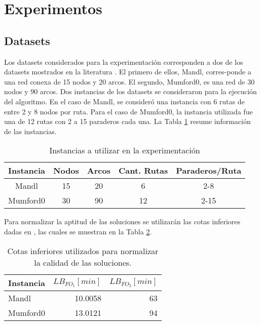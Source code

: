 \section{Experimentos}

\subsection{Datasets}

Los datasets considerados para la experimentación corresponden a dos de los datasets mostrados en la literatura \cite{john2014improved,NewHaEOps}. El primero de ellos, Mandl, corres-ponde a una red conexa de 15 nodos y 20 arcos. El segundo, Mumford0, es una red de 30 nodos y 90 arcos.  Dos instancias de los datasets se consideraron para la ejecución del algoritmo. En el caso de Mandl, se consideró una instancia con 6 rutas de entre 2 y 8 nodos por ruta. Para el caso de Mumford0, la instancia utilizada fue una de 12 rutas con 2 a 15 paraderos cada una. La Tabla \ref{tab:instancias} resume información de las instancias. 

\begin{table}[!htb]
\begin{center}
\begin{tabular}{|c|c|c|c|c|}
\hline
Instancia & Nodos & Arcos & Cant. Rutas & Paraderos/Ruta \\
\hline
\hline
Mandl & 15 & 20 & 6 & 2-8 \\
Mumford0 & 30 & 90 & 12 & 2-15\\
\hline
\end{tabular}
\end{center}
\caption{Instancias a utilizar en la experimentación}
\label{tab:instancias}
\end{table}

Para normalizar la aptitud de las soluciones se utilizarán las cotas inferiores dadas en \cite{NewHaEOps}, las cuales se muestran en la Tabla \ref{tab:norm}.

\begin{table}[!htb]
\begin{center}
\begin{tabular}{|l|r|r|}
\hline
Instancia & $LB_{FO_1} [min]$ & $LB_{FO_2} [min]$\\
\hline
\hline
Mandl & 10.0058 & 63 \\
Mumford0 & 13.0121 & 94 \\
\hline
\end{tabular}
\end{center}
\caption{Cotas inferiores utilizados para normalizar la calidad de las soluciones.}
\label{tab:norm}
\end{table}


